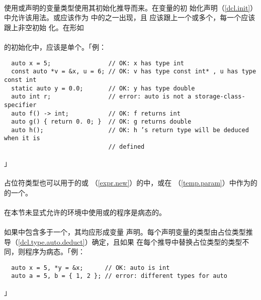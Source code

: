 \paragraph{}
使用或声明的变量类型使用其初始化推导而来。在变量的初
始化声明（\ref{dcl.init}）中允许该用法。或应该作为
中的之一出现，且
应该跟上一个或多个，每一个应该跟上非空初始
化。在形如                                                                    \\
\mbox{\qquad \tm{(}  \tm{)}}                              \\
的初始化中，应该是单个。「例：
\begin{lstlisting}
  auto x = 5;                // OK: x has type int
  const auto *v = &x, u = 6; // OK: v has type const int* , u has type const int
  static auto y = 0.0;       // OK: y has type double
  auto int r;                // error: auto is not a storage-class-specifier
  auto f() -> int;           // OK: f returns int
  auto g() { return 0. 0; }  // OK: g returns double
  auto h();                  // OK: h ’s return type will be deduced when it is
                             // defined
\end{lstlisting}」

\paragraph{}
占位符类型也可以用于的或
（\ref{expr.new}）的中，或在
（\ref{temp.param}）中作为的
的一个。

\paragraph{}
在本节未显式允许的环境中使用或的程序是病态的。

\paragraph{}
如果中包含多于一个，其均应形成变量
声明。每个声明变量的类型由占位类型推导（\ref{dcl.type.auto.deduct}）确定，且如果
在每个推导中替换占位类型的类型不同，则程序为病态。「例：
\begin{lstlisting}
  auto x = 5, *y = &x;      // OK: auto is int
  auto a = 5, b = { 1, 2 }; // error: different types for auto
\end{lstlisting}」

